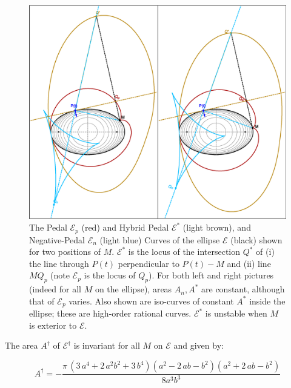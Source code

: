 \begin{figure}
    \centering
    \includegraphics[width=\textwidth]{pics/0040_hybrid_curve.eps}
    \caption{The Pedal $\mathcal{E}_p$ (red) and Hybrid Pedal $\mathcal{E}^*$ (light brown), and Negative-Pedal $\mathcal{E}_n$ (light blue) Curves of the ellipse $\mathcal{E}$ (black) shown for two positions of $M$. $\mathcal{E}^*$ is the locus of the intersection $Q^*$ of (i) the line through $P(t)$ perpendicular to $P(t)-M$ and (ii) line $M{Q_p}$ (note $\mathcal{E}_p$ is the locus of $Q_p$). For both left and right pictures (indeed for all $M$ on the ellipse), areas $A_n,A^*$ are constant, although that of $\mathcal{E}_p$ varies. Also shown are iso-curves of constant $A^*$ inside the ellipse; these are high-order rational curves. $\mathcal{E}^*$ is unstable when $M$ is exterior to $\mathcal{E}$.}
    \label{fig:hybrid}
\end{figure}

\begin{theorem}
The area $A^\dagger$ of $\mathcal{E}^\dagger$ is invariant for all $M$ on $\mathcal{E}$ and given by:
	
	\[ A^\dagger=  -  \frac {\pi\, \left( 3\,{a}^{4}+2\,{a}^{2}{b}^{2}+3\,{b}^{4}
 \right)  \left( {a}^{2}-2\,ab-{b}^{2} \right)  \left( {a}^{2}+2\,ab-{
b}^{2} \right) }{8 a^{3} b^{3}}
	\]
\end{theorem}

